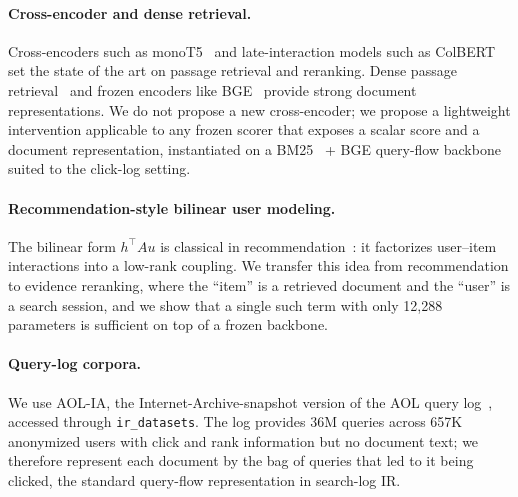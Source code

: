 \paragraph{Cross-encoder and dense retrieval.}
Cross-encoders such as monoT5~\cite{nogueira2020monot5} and late-interaction models such as ColBERT~\cite{khattab2020colbert} set the state of the art on passage retrieval and reranking. Dense passage retrieval~\cite{karpukhin2020dpr} and frozen encoders like BGE~\cite{xiao2023bge} provide strong document representations. We do not propose a new cross-encoder; we propose a lightweight intervention applicable to any frozen scorer that exposes a scalar score and a document representation, instantiated on a BM25~\cite{robertson2009bm25} + BGE query-flow backbone suited to the click-log setting.

\paragraph{Recommendation-style bilinear user modeling.}
The bilinear form $h^\top A u$ is classical in recommendation~\cite{he2017nfm,xiao2017afm}: it factorizes user--item interactions into a low-rank coupling. We transfer this idea from recommendation to evidence reranking, where the ``item'' is a retrieved document and the ``user'' is a search session, and we show that a single such term with only 12{,}288 parameters is sufficient on top of a frozen backbone.

\paragraph{Query-log corpora.}
We use AOL-IA, the Internet-Archive-snapshot version of the AOL query log~\cite{pass2006_picture}, accessed through \texttt{ir\_datasets}. The log provides 36M queries across 657K anonymized users with click and rank information but no document text; we therefore represent each document by the bag of queries that led to it being clicked, the standard query-flow representation in search-log IR.
